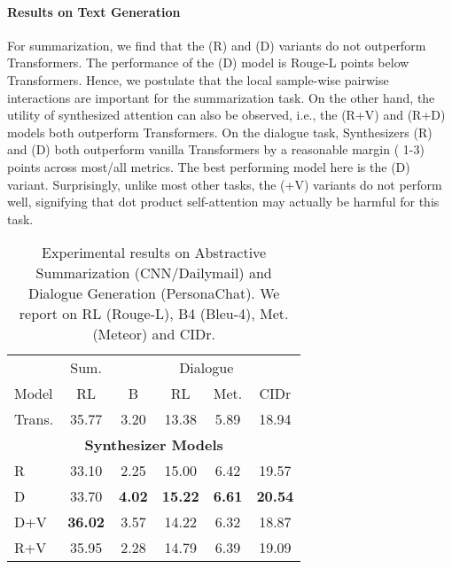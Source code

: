 \documentclass{article} \usepackage{iclr2021_conference,times}
\begin{document}
\begin{minipage}{0.54\linewidth}
\paragraph{Results on Text Generation} 
For summarization, we find that the (R) and (D) variants do not outperform Transformers. The performance of the (D) model is  Rouge-L points below Transformers. Hence, we postulate that the local sample-wise pairwise interactions are important for the summarization task. On the other hand, the utility of synthesized attention can also be observed, i.e., the (R+V) and (R+D) models both outperform Transformers. On the dialogue task, Synthesizers (R) and (D) both outperform vanilla Transformers by a reasonable margin ( 1-3) points across most/all metrics. The best performing model here is the (D) variant. Surprisingly, unlike most other tasks, the (+V) variants do not perform well, signifying that dot product self-attention may actually be harmful for this task.
\end{minipage}
\begin{minipage}{0.44\linewidth}
\begin{table}[H]
\small
    \centering
    \begin{tabular}{l|c|cccc}
    \hline
    & \multicolumn{1}{c}{Sum.} & \multicolumn{4}{c}{Dialogue} \\
        Model &	 RL & B & RL & Met. & CIDr \\
        \hline
Trans. &35.77 & 3.20 & 13.38 & 5.89 & 18.94  \\
\hline
\multicolumn{6}{c}{\textbf{Synthesizer Models}} \\ 
\hline
R & 33.10 & 2.25 & 15.00 & 6.42 & 19.57  \\
D	&  33.70  & \textbf{4.02} & \textbf{15.22} & \textbf{6.61} & \textbf{20.54}  \\
D+V &  \textbf{36.02} & 3.57 &  14.22 & 6.32 & 18.87  \\ 
R+V &	 	35.95 & 2.28 & 14.79 & 6.39& 19.09  \\
\hline
    \end{tabular}
    \caption{Experimental results on Abstractive Summarization (CNN/Dailymail) and Dialogue Generation (PersonaChat). We report on RL (Rouge-L), B4 (Bleu-4), Met. (Meteor) and CIDr. }
    \label{tab:gen}
\end{table}
\end{minipage}
\end{document}
